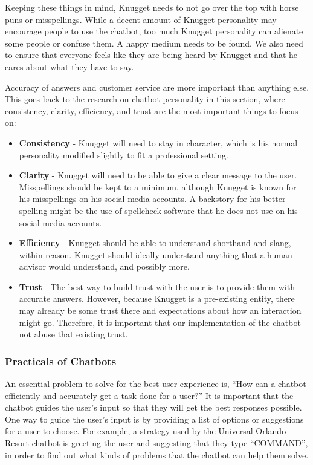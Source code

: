 \documentclass[titlepage, 12pt]{article}
\begin{document}
Keeping these things in mind, Knugget needs to not go over the top with horse puns or misspellings. While a decent amount of Knugget personality may encourage people to use the chatbot, too much Knugget personality can alienate some people or confuse them. A happy medium needs to be found. We also need to ensure that everyone feels like they are being heard by Knugget and that he cares about what they have to say.

Accuracy of answers and customer service are more important than anything else. This goes back to the research on chatbot personality in this section, where consistency, clarity, efficiency, and trust are the most important things to focus on:

\begin{itemize}
    \item \textbf{Consistency} - Knugget will need to stay in character, which is his normal personality modified slightly to fit a professional setting.
    \item \textbf{Clarity} - Knugget will need to be able to give a clear message to the user. Misspellings should be kept to a minimum, although Knugget is known for his misspellings on his social media accounts. A backstory for his better spelling might be the use of spellcheck software that he does not use on his social media accounts.
    \item \textbf{Efficiency} - Knugget should be able to understand shorthand and slang, within reason. Knugget should ideally understand anything that a human advisor would understand, and possibly more.
    \item \textbf{Trust} - The best way to build trust with the user is to provide them with accurate answers. However, because Knugget is a pre-existing entity, there may already be some trust there and expectations about how an interaction might go. Therefore, it is important that our implementation of the chatbot not abuse that existing trust.
\end{itemize}

\subsubsection{Practicals of Chatbots}

An essential problem to solve for the best user experience is, “How can a chatbot efficiently and accurately get a task done for a user?” It is important that the chatbot guides the user’s input so that they will get the best responses possible. One way to guide the user’s input is by providing a list of options or suggestions for a user to choose. For example, a strategy used by the Universal Orlando Resort chatbot is greeting the user and suggesting that they type “COMMAND”, in order to find out what kinds of problems that the chatbot can help them solve.
\end{document}
